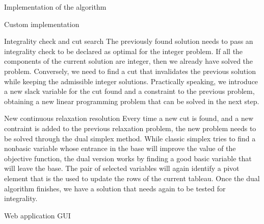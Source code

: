 \documentclass[9pt]{extarticle}
\begin{document}
\begin{section}{Implementation of the algorithm}
\begin{subsection}{Custom implementation}
            \begin{subsubsection}{Integrality check and cut search}
                The previously found solution needs to pass an integrality check to be declared as optimal for the integer problem.
                If all the components of the current solution are integer, then we already have solved the problem.
                Conversely, we need to find a cut that invalidates the previous solution while keeping the admissible integer solutions.
                Practically speaking, we introduce a new slack variable for the cut found and a constraint to the previous problem,
                obtaining a new linear programming problem that can be solved in the next step.
            \end{subsubsection}

            \begin{subsubsection}{New continuous relaxation resolution}
                Every time a new cut is found, and a new contraint is added to the previous relaxation problem, the new problem needs to be solved
                through the dual simplex method.
                While classic simplex tries to find a nonbasic variable whose entrance in the base will improve the value of the objective function,
                the dual version works by finding a good basic variable that will leave the base.
                The pair of selected variables will again identify a pivot element that is the used to update the rows of the current tableau.
                Once the dual algorithm finishes, we have a solution that needs again to be tested for integrality.
            \end{subsubsection}
        \end{subsection}

        \begin{subsection}{Web application GUI}
            


\end{subsection}
\end{section}
\end{document}
